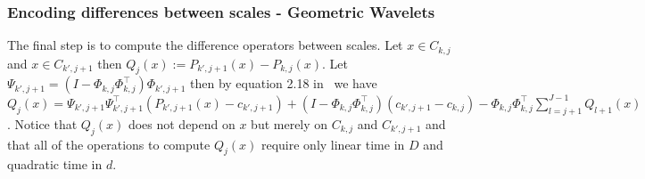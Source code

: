 \documentclass{article}
\begin{document}
  \subsubsection{Encoding differences between scales - Geometric Wavelets}
  The final step is to compute the difference operators between scales. Let $x \in C_{k,j}$ and $x \in C_{k',j+1}$ then $Q_j(x) := P_{k',j+1}(x) - P_{k,j}(x)$. Let $\Psi_{k',j+1} = \left(I - \Phi_{k,j}\Phi_{k,j}^{\top}\right)\Phi_{k',j+1}$ then by equation 2.18 in~\cite{allard2012multi} we have $Q_j(x) = \Psi_{k',j+1}\Psi_{k',j+1}^{\top}\left(P_{k',j+1}(x) - c_{k',j+1}\right) + \left(I - \Phi_{k,j}\Phi_{k,j}^{\top}\right)(c_{k',j+1} - c_{k,j}) - \Phi_{k,j}\Phi_{k,j}^{\top}\sum_{l=j+1}^{J-1}Q_{l+1}(x)$. Notice that $Q_j(x)$ does not depend on $x$ but merely on $C_{k,j}$ and $C_{k',j+1}$ and that all of the operations to compute $Q_j(x)$ require only linear time in $D$ and quadratic time in $d$.
\end{document}
